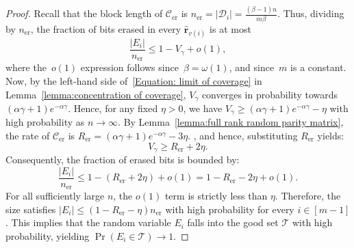 \documentclass[journal,letterpaper,onecolumn,11pt]{IEEEtran}
\newcommand{\cC}{\mathcal{C}}
\newcommand{\cD}{\mathcal{D}}
\newcommand{\cT}{\mathcal{T}}
\newcommand{\boldr}{\mathbf{r}}
\begin{document}
\begin{proof}
Recall that the block length of $\cC_{\mathrm{er}}$ is $n_{\mathrm{er}} = |\cD_i| = \frac{(\beta-1)n}{m\beta}$.
Thus, dividing by $n_{\mathrm{er}}$, the fraction of bits erased in every $\hat{\boldr}_{v(i)}$ is at most
\[
    \frac{|E_i|}{n_{\mathrm{er}}}
    \le
    1-V_\gamma+o(1),
\]
where the~$o(1)$ expression follows since~$\beta=\omega(1)$, and since~$m$ is a constant.
Now, by the left-hand side of~\eqref{Equation: limit of coverage} in Lemma~\ref{lemma:concentration of coverage}, $V_\gamma$ converges in probability towards $(\alpha\gamma+1)e^{-\alpha\gamma}$. Hence, for any fixed $\eta>0$, we have $V_\gamma \ge (\alpha\gamma+1)e^{-\alpha\gamma}-\eta$ with high probability as $n \to\infty$. 
By Lemma~\ref{lemma:full rank random parity matrix}, the rate of $\cC_{\mathrm{er}}$ is $R_{\mathrm{er}} = (\alpha\gamma+1)e^{-\alpha\gamma}-3\eta$. 
, and hence, substituting $R_{\mathrm{er}}$ yields:
\[
    V_\gamma \ge R_{\mathrm{er}} + 2\eta.
\]
Consequently, the fraction of erased bits is bounded by:
\[
    \frac{|E_i|}{n_{\mathrm{er}}} \le 1 - (R_{\mathrm{er}} + 2\eta) + o(1) = 1 - R_{\mathrm{er}} - 2\eta + o(1).
\]
For all sufficiently large $n$, the $o(1)$ term is strictly less than $\eta$. Therefore, the size satisfies $|E_i| \le (1-R_{\mathrm{er}}-\eta)n_{\mathrm{er}}$ with high probability for every $i \in [m-1]$. This implies that the random variable $E_i$ falls into the good set $\cT$ with high probability, yielding $\Pr(E_i \in \cT) \to 1$.
\end{proof}
\end{document}
